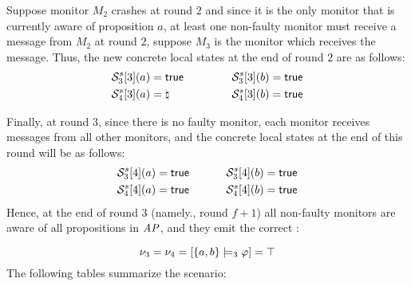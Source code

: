 Suppose monitor $M_2$ crashes at round $2$ and since it is the only monitor 
that is currently aware of proposition $a$, at least one non-faulty monitor 
must receive a message from $M_2$ at round $2$, suppose $M_3$ is the monitor 
which receives the message.  Thus, the new concrete local states at the end of 
round $2$ are as follows:
\begin{alignat*}{2}
&\mathcal{S}^s_3[3](a) = \mathsf{true} ~~~~~~~~~~& \mathcal{S}^s_3[3](b) = \mathsf{true} \\ 
&\mathcal{S}^s_4[3](a) = \natural & \mathcal{S}^s_4[3](b) = \mathsf{true}
\end{alignat*}

Finally, at round $3$, since there is no faulty monitor, each monitor receives 
messages from all other monitors, and the concrete local states at the end of 
this round will be as follows:
\begin{alignat*}{2}
&\mathcal{S}^s_3[4](a) = \mathsf{true} ~~~~~~~& \mathcal{S}^s_3[4](b) = \mathsf{true} \\ 
&\mathcal{S}^s_4[4](a) = \mathsf{true} & \mathcal{S}^s_4[4](b) = \mathsf{true}
\end{alignat*}
Hence, at the end of round $3$ (namely., round $f+1$) all non-faulty monitors are aware 
of all propositions in $\mathit{AP}$, and they emit the correct \truthvalue:

$$\nu_3 = \nu_4 = [\{a,b\} \models_3 \varphi] = \top$$
The following tables summarize the scenario: \\

